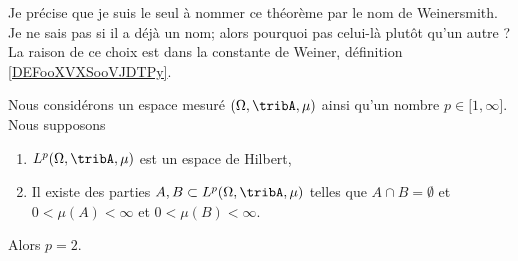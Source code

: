 Je précise que je suis le seul à nommer ce théorème par le nom de Weinersmith. Je ne sais pas si il a déjà un nom; alors pourquoi pas celui-là plutôt qu'un autre ? La raison de ce choix est dans la constante de Weiner, définition \ref{DEFooXVXSooVJDTPy}.
\begin{theorem}      \label{THOooCCMBooGulxkQ}
	Nous considérons un espace mesuré \( (\Omega,\tribA, \mu)\) ainsi qu'un nombre \( p\in \mathopen[ 1 , \infty \mathclose]\). Nous supposons
	\begin{enumerate}
		\item
		      \( L^p(\Omega,\tribA,\mu)\) est un espace de Hilbert,
		\item
		      Il existe des parties \( A,B\subset L^p(\Omega,\tribA,\mu)\) telles que \( A\cap B=\emptyset\) et \( 0<\mu(A)<\infty\) et \( 0<\mu(B)<\infty\).
	\end{enumerate}
	Alors \( p=2\).
\end{theorem}

